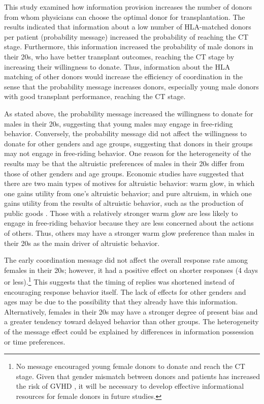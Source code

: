 \documentclass[12pt, a4paper]{article}
\begin{document}
This study examined how information provision increases the number of donors from whom physicians can choose the optimal donor for transplantation. The results indicated that information about a low number of HLA-matched donors per patient (probability message) increased the probability of reaching the CT stage. Furthermore, this information increased the probability of male donors in their 20s, who have better transplant outcomes, reaching the CT stage by increasing their willingness to donate. Thus, information about the HLA matching of other donors would increase the efficiency of coordination in the sense that the probability message increases donors, especially young male donors with good transplant performance, reaching the CT stage.

As stated above, the probability message increased the willingness to donate for males in their 20s, suggesting that young males may engage in free-riding behavior. Conversely, the probability message did not affect the willingness to donate for other genders and age groups, suggesting that donors in their groups may not engage in free-riding behavior. One reason for the heterogeneity of the results may be that the altruistic preferences of males in their 20s differ from those of other genders and age groups. Economic studies have suggested that there are two main types of motives for altruistic behavior: warm glow, in which one gains utility from one's altruistic behavior; and pure altruism, in which one gains utility from the results of altruistic behavior, such as the production of public goods \citep[e.g.,][]{Andreoni1990}. Those with a relatively stronger warm glow are less likely to engage in free-riding behavior because they are less concerned about the actions of others. Thus, others may have a stronger warm glow preference than males in their 20s as the main driver of altruistic behavior.

The early coordination message did not affect the overall response rate among females in their 20s; however, it had a positive effect on shorter responses (4 days or less).\footnote{No message encouraged young female donors to donate and reach the CT stage. Given that gender mismatch between donors and patients has increased the risk of GVHD \citep{Loren2006, Nannya2011}, it will be necessary to develop effective informational resources for female donors in future studies.} This suggests that the timing of replies was shortened instead of encouraging response behavior itself. The lack of effects for other genders and ages may be due to the possibility that they already have this information. Alternatively, females in their 20s may have a stronger degree of present bias and a greater tendency toward delayed behavior than other groups. The heterogeneity of the message effect could be explained by differences in information possession or time preferences.
\end{document}
